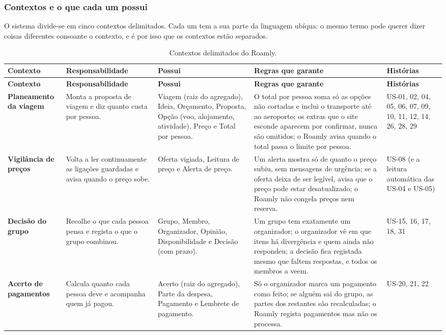 \subsubsection{Contextos e o que cada um possui}
O sistema divide-se em cinco contextos delimitados. Cada um tem a sua parte da linguagem ubíqua: o mesmo termo pode querer dizer coisas diferentes consoante o contexto, e é por isso que os contextos estão separados.

\begin{longtable}{@{}p{2.4cm}p{3.2cm}p{2.7cm}p{4.0cm}p{1.9cm}@{}}
\caption{Contextos delimitados do Roamly.}\label{tab:contextos}\\
\toprule \textbf{Contexto} & \textbf{Responsabilidade} & \textbf{Possui} & \textbf{Regras que garante} & \textbf{Histórias} \\ \midrule \endfirsthead
\toprule \textbf{Contexto} & \textbf{Responsabilidade} & \textbf{Possui} & \textbf{Regras que garante} & \textbf{Histórias} \\ \midrule \endhead
\textbf{Planeamento da viagem} & Monta a proposta de viagem e diz quanto custa por pessoa. & Viagem (raiz do agregado), Ideia, Orçamento, Proposta, Opção (voo, alojamento, atividade), Preço e Total por pessoa. & O total por pessoa soma só as opções não cortadas e inclui o transporte até ao aeroporto; os extras que o site esconde aparecem \guillemotleft{}por confirmar\guillemotright{}, nunca são omitidos; o Roamly avisa quando o total passa o limite por pessoa. & US-01, 02, 04, 05, 06, 07, 09, 10, 11, 12, 14, 26, 28, 29 \\ \midrule
\textbf{Vigilância de preços} & Volta a ler continuamente as ligações guardadas e avisa quando o preço sobe. & Oferta vigiada, Leitura de preço e Alerta de preço. & Um alerta mostra só de quanto o preço subiu, sem mensagens de urgência; se a oferta deixa de ser legível, avisa que o preço pode estar desatualizado; o Roamly não congela preços nem reserva. & US-08 (e a leitura automática das US-04 e US-05) \\ \midrule
\textbf{Decisão do grupo} & Recolhe o que cada pessoa pensa e regista o que o grupo combinou. & Grupo, Membro, Organizador, Opinião, Disponibilidade e Decisão (com prazo). & Um grupo tem exatamente um organizador; o organizador vê em que itens há divergência e quem ainda não respondeu; a decisão fica registada mesmo que faltem respostas, e todos os membros a veem. & US-15, 16, 17, 18, 31 \\ \midrule
\textbf{Acerto de pagamentos} & Calcula quanto cada pessoa deve e acompanha quem já pagou. & Acerto (raiz do agregado), Parte da despesa, Pagamento e Lembrete de pagamento. & Só o organizador marca um pagamento como feito; se alguém sai do grupo, as partes dos restantes são recalculadas; o Roamly regista pagamentos mas não os processa. & US-20, 21, 22 \\ \midrule

\end{longtable}

